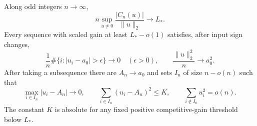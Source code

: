\begin{lemma}
\label{lem:asymptotic-single-parity}
Along odd integers $n\to\infty$,
\[
 n\sup_{u\ne0}\frac{|C_n(u)|}{\|u\|_2}\longrightarrow L_*.
\]
Every sequence with scaled gain at least $L_*-o(1)$ satisfies, after
input sign changes,
\[
 \frac1n\#\{i:|u_i-a_0|>\epsilon\}\longrightarrow0
 \quad(\epsilon>0),\qquad
 \frac{\|u\|_2^2}{n}\longrightarrow a_0^2.
\]
After taking a subsequence there are $A_n\to a_0$ and sets $I_n$ of
size $n-o(n)$ such that
\begin{equation}\label{eq:single-parity-bulk}
 \max_{i\in I_n}|u_i-A_n|\to0,\qquad
 \sum_{i\in I_n}(u_i-A_n)^2\le K,\qquad
 \sum_{i\notin I_n}u_i^2=o(n).
\end{equation}
The constant $K$ is absolute for any fixed positive competitive-gain
threshold below $L_*$.
\end{lemma}
